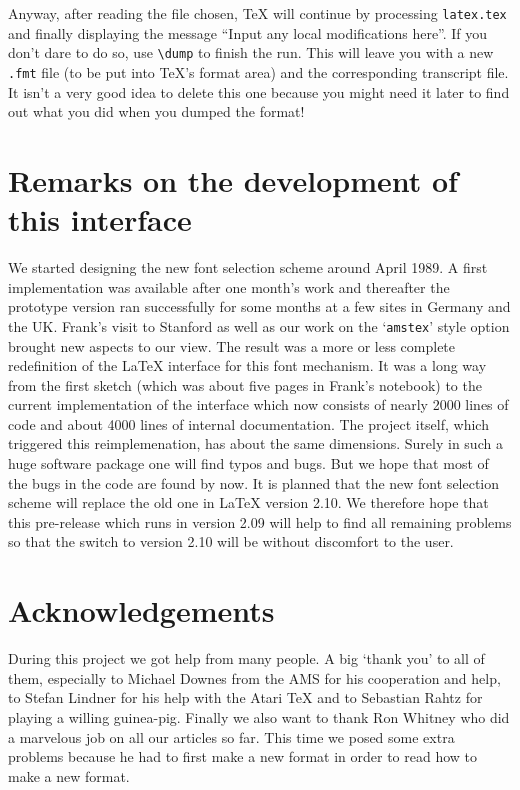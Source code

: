 Anyway, after reading the file chosen, \TeX{} will continue by
 processing {\tt latex.tex} and finally displaying the message ``Input
 any local modifications here''.  If you don't dare to do so, use
 \verb+\dump+ to finish the run.  This will leave you with a new {\tt
 .fmt} file (to be put into \TeX's format area) and the corresponding
 transcript file.  It isn't a very good idea to delete this one
 because you might need it later to find out what you did when you
 dumped the format!
 
 
 \section{Remarks on the development of this interface}
 
 We started designing the  new font selection scheme
 around April 1989.  A first implementation was
 available after one month's work and thereafter the
 prototype version ran successfully for some months at a
 few sites in Germany and the UK\null. Frank's visit to
 Stanford as well as our work on the `{\tt amstex}' style
 option brought new aspects to our view. The result was
 a more or less complete redefinition of the \LaTeX{}
 interface for this font mechanism.  It was a long way
 from the first sketch (which was about five pages in
 Frank's notebook) to the current implementation
 of
 the
 interface which now consists of nearly 2000 lines of code
 and about 4000 lines of internal documentation. The
 \AmSTeX{} project itself, which triggered this
 reimplemenation, has about the same dimensions. Surely
 in such a huge software package one will find typos
 and bugs. But we hope that most of the bugs in the
 code are found by now. It is planned that the new font selection
 scheme will replace the old one in \LaTeX{} version 2.10.
 We therefore hope that this pre-release which runs in version
 2.09 will help to find all remaining  problems so that the switch
 to version 2.10 will be without discomfort to the user.
 
 \section{Acknowledgements}
During this project we got help from many people. A big `thank you'
to all of them, especially to Michael Downes from the AMS for his
cooperation and help, to Stefan Lindner for his help with the
Atari \TeX{} and to Sebastian Rahtz for playing a willing
guinea-pig. Finally we also want to thank Ron Whitney who did a
marvelous job on all our articles so far. This time we posed some
extra problems because he had to first make a new format in
order to read how to make a new format.
 
